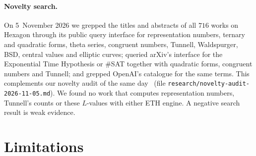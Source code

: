\documentclass[10pt]{amsart}
\theoremstyle{plain}
\theoremstyle{definition}
\theoremstyle{remark}
\numberwithin{equation}{section}
\begin{document}
\paragraph{Novelty search.} On 5~November 2026 we grepped the titles and abstracts of all $716$ works on Hexagon
through its public query interface for representation numbers, ternary and quadratic forms, theta series,
congruent numbers, Tunnell, Waldspurger, BSD, central values and elliptic curves; queried arXiv's interface for the
Exponential Time Hypothesis or $\#$SAT together with quadratic forms, congruent numbers and Tunnell; and grepped
OpenAI's catalogue for the same terms. This complements our novelty audit of the same day~\cite{TulsyanRepo26}
(file \texttt{research/novelty-audit-2026-11-05.md}). We found no work that computes representation numbers,
Tunnell's counts or these $L$-values with either ETH engine. A negative search result is weak evidence.

\section{Limitations}\label{sec:limitations}
\end{document}
